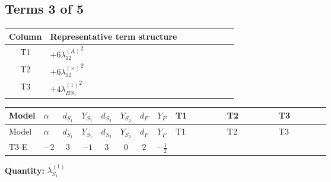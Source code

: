 \documentclass[8pt]{article}
\begin{document}
\begin{landscape}
\subsection*{Terms 3 of 5}
\begin{center}
\begin{tabular}{@{}c >{\raggedright\arraybackslash}p{0.82\linewidth}@{}}
\toprule
Column & Representative term structure \\
\midrule
T1 & \(\displaystyle +6 {\lambda_{12}^{(A)}}^2\) \\
\midrule
T2 & \(\displaystyle +6 {\lambda_{12}^{(\times)}}^2\) \\
\midrule
T3 & \(\displaystyle +4 {\lambda_{HS_1}^{(1)}}^2\) \\
\midrule
\bottomrule
\end{tabular}
\end{center}
\smallskip
\tiny
\begin{longtable}{@{}llcccccc >{\raggedright\arraybackslash}p{0.21\linewidth} >{\raggedright\arraybackslash}p{0.21\linewidth} >{\raggedright\arraybackslash}p{0.21\linewidth}@{}}
\toprule
Model & $\alpha$ & $d_{S_1}$ & $Y_{S_1}$ & $d_{S_2}$ & $Y_{S_2}$ & $d_F$ & $Y_F$ & T1 & T2 & T3 \\
\midrule
\endfirsthead
\toprule
Model & $\alpha$ & $d_{S_1}$ & $Y_{S_1}$ & $d_{S_2}$ & $Y_{S_2}$ & $d_F$ & $Y_F$ & T1 & T2 & T3 \\
\midrule
\endhead
T3-E & $-2$ & $3$ & $-1$ & $3$ & $0$ & $2$ & $-\frac{1}{2}$ & \scriptsize\adjustbox{max width=\linewidth}{$\begin{gathered} +6 {\lambda_{12}^{(A)}}^2\end{gathered}$} & \scriptsize\adjustbox{max width=\linewidth}{$\begin{gathered} +6 {\lambda_{12}^{(\times)}}^2\end{gathered}$} & \scriptsize\adjustbox{max width=\linewidth}{$\begin{gathered} +4 {\lambda_{HS_1}^{(1)}}^2\end{gathered}$} \\
\midrule
\bottomrule
\end{longtable}
\clearpage
\noindent\textbf{Quantity: }$\lambda_{S_1}^{(1)}$\par\smallskip

\end{landscape}
\end{document}
